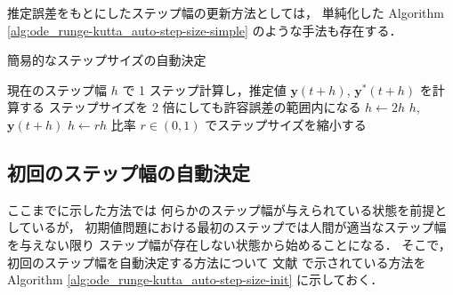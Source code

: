 推定誤差をもとにしたステップ幅の更新方法としては，
単純化した
Algorithm \ref{alg:ode_runge-kutta_auto-step-size-simple}
のような手法も存在する．

\begin{algorithm}[tp]
    \caption{簡易的なステップサイズの自動決定 \cite[4.1 節 (a)]{Mitsui1993}}
    \label{alg:ode_runge-kutta_auto-step-size-simple}
    \begin{algorithmic}
        \Loop
        \State 現在のステップ幅 $h$ で 1 ステップ計算し，推定値 $\bm{y}(t + h)$, $\bm{y}^*(t+h)$ を計算する
        \Comment ステップサイズを 2 倍にしても許容誤差の範囲内になる
        \State $h \gets 2 h$
        \EndIf
        \State \Return $h$, $\bm{y}(t + h)$
        \EndIf
        \State $h \gets r h$ \Comment 比率 $r \in (0, 1)$ でステップサイズを縮小する
        \EndLoop
        \EndProcedure
    \end{algorithmic}
\end{algorithm}

\subsection{初回のステップ幅の自動決定}

ここまでに示した方法では
何らかのステップ幅が与えられている状態を前提としているが，
初期値問題における最初のステップでは人間が適当なステップ幅を与えない限り
ステップ幅が存在しない状態から始めることになる．
そこで，初回のステップ幅を自動決定する方法について
文献 \cite[Section II.4]{Hairer1993} で示されている方法を
Algorithm \ref{alg:ode_runge-kutta_auto-step-size-init}
に示しておく．

